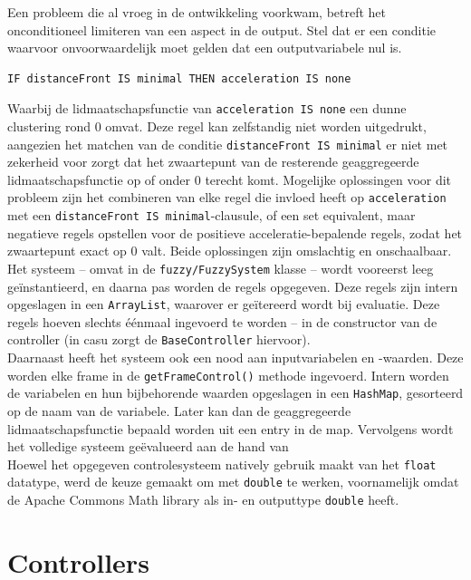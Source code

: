 \documentclass[10pt,a4paper]{article}
\begin{document}
		Een probleem die al vroeg in de ontwikkeling voorkwam, betreft het onconditioneel limiteren van een aspect in de output. Stel dat er een conditie waarvoor onvoorwaardelijk moet gelden dat een outputvariabele nul is.

		\begin{lstlisting}
IF distanceFront IS minimal THEN acceleration IS none
		\end{lstlisting}

		Waarbij de lidmaatschapsfunctie van \texttt{acceleration IS none} een dunne clustering rond $0$ omvat. Deze regel kan zelfstandig niet worden uitgedrukt, aangezien het matchen van de conditie \texttt{distanceFront IS minimal} er niet met zekerheid voor zorgt dat het zwaartepunt van de resterende geaggregeerde lidmaatschapsfunctie op of onder $0$ terecht komt. Mogelijke oplossingen voor dit probleem zijn het combineren van elke regel die invloed heeft op \texttt{acceleration} met een \texttt{distanceFront IS minimal}-clausule, of een set equivalent, maar negatieve regels opstellen voor de positieve acceleratie-bepalende regels, zodat het zwaartepunt exact op $0$ valt. Beide oplossingen zijn omslachtig en onschaalbaar.\\

		Het systeem -- omvat in de \texttt{fuzzy/FuzzySystem} klasse -- wordt vooreerst leeg ge\"instantieerd, en daarna pas worden de regels opgegeven. Deze regels zijn intern opgeslagen in een \texttt{ArrayList}, waarover er ge\"itereerd wordt bij evaluatie. Deze regels hoeven slechts \'e\'enmaal ingevoerd te worden -- in de constructor van de controller (in casu zorgt de \texttt{BaseController} hiervoor).\\

		Daarnaast heeft het systeem ook een nood aan inputvariabelen en -waarden. Deze worden elke frame in de \texttt{getFrameControl()} methode ingevoerd. Intern worden de variabelen en hun bijbehorende waarden opgeslagen in een \texttt{HashMap}, gesorteerd op de naam van de variabele. Later kan dan de geaggregeerde lidmaatschapsfunctie bepaald worden uit een entry in de map. Vervolgens wordt het volledige systeem ge\"evalueerd aan de hand van \\

		Hoewel het opgegeven controlesysteem natively gebruik maakt van het \texttt{float} datatype, werd de keuze gemaakt om met \texttt{double} te werken, voornamelijk omdat de Apache Commons Math library als in- en outputtype \texttt{double} heeft.

	\section{Controllers}
\end{document}
